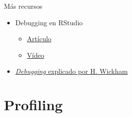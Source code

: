 \documentclass[xcolor={usenames,svgnames,dvipsnames}]{beamer}
\begin{document}
\begin{frame}[label={sec:org149fb0e}]{Más recursos}
\begin{itemize}
\item Debugging en RStudio
\begin{itemize}
\item \href{https://support.rstudio.com/hc/en-us/articles/205612627-Debugging-with-RStudio}{Artículo}
\item \href{https://vimeo.com/97831988}{Vídeo}
\end{itemize}
\item \href{http://adv-r.had.co.nz/Exceptions-Debugging.html}{\emph{Debugging} explicado por H. Wickham}
\end{itemize}
\end{frame}

\section{Profiling}
\label{sec:org6c21914}
\end{document}

